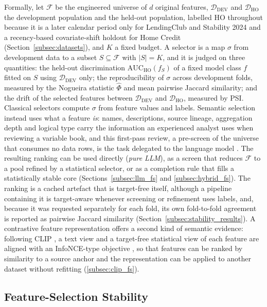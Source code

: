 \documentclass[final,5p,twocolumn]{elsarticle}
\newcommand{\Kfeat}{K}
\newcommand{\AUC}{\mathrm{AUC}}
\begin{document}
Formally, let $\mathcal{F}$ be the engineered universe of $d$ original features, $\mathcal{D}_{\mathrm{DEV}}$ and $\mathcal{D}_{\mathrm{HO}}$ the development population and the held-out population, labelled HO throughout because it is a later calendar period only for LendingClub and Stability 2024 and a recency-based covariate-shift holdout for Home Credit (Section~\ref{subsec:datasets}), and $\Kfeat$ a fixed budget. A selector is a map $\sigma$ from development data to a subset $S\subseteq\mathcal{F}$ with $|S|=\Kfeat$, and it is judged on three quantities: the held-out discrimination $\AUC_{\mathrm{HO}}(f_S)$ of a fixed model class $f$ fitted on $S$ using $\mathcal{D}_{\mathrm{DEV}}$ only; the reproducibility of $\sigma$ across development folds, measured by the Nogueira statistic $\hat\Phi$ and mean pairwise Jaccard similarity; and the drift of the selected features between $\mathcal{D}_{\mathrm{DEV}}$ and $\mathcal{D}_{\mathrm{HO}}$, measured by PSI. Classical selectors compute $\sigma$ from feature values and labels. Semantic selection instead uses what a feature \emph{is}: names, descriptions, source lineage, aggregation depth and logical type carry the information an experienced analyst uses when reviewing a variable book, and this first-pass review, a pre-screen of the universe that consumes no data rows, is the task delegated to the language model \cite{jeong2025,li2025sigkdd}. The resulting ranking can be used directly (\emph{pure LLM}), as a screen that reduces $\mathcal{F}$ to a pool refined by a statistical selector, or as a completion rule that fills a statistically stable core (Sections~\ref{subsec:llm_fs} and \ref{subsec:hybrid_fs}). The ranking is a cached artefact that is target-free itself, although a pipeline containing it is target-aware whenever screening or refinement uses labels, and, because it was requested separately for each fold, its own fold-to-fold agreement is reported as pairwise Jaccard similarity (Section~\ref{subsec:stability_results}). A contrastive feature representation offers a second kind of semantic evidence: following CLIP \cite{radford2021}, a text view and a target-free statistical view of each feature are aligned with an InfoNCE-type objective \cite{oord2018}, so that features can be ranked by similarity to a source anchor and the representation can be applied to another dataset without refitting (\ref{subsec:clip_fs}).

\subsection{Feature-Selection Stability}
\label{subsec:fs_stability_background}
\end{document}
